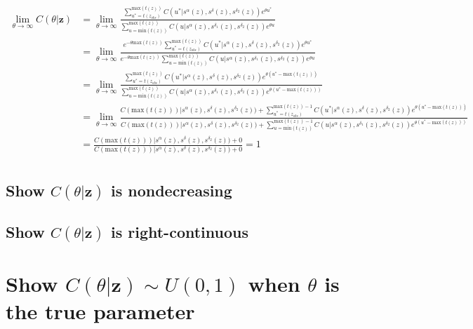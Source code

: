 \documentclass{article}
\begin{document}
\begin{align*}
  \lim_{\theta \to \infty} C(\theta|\textbf{z}) 
  &= \lim_{\theta \to \infty} \frac
  {\sum_{u^*=t(z_{obs})}^{\text{max}(t(z))} C(u^*|s^\alpha(z), s^\delta(z), s^{\delta_2}(z))e^{\theta u^*}}
  {\sum_{u=\text{min}(t(z))}^{\text{max}(t(z))} C(u|s^\alpha(z), s^{\delta_1}(z), s^{\delta_2}(z))e^{\theta u}} \\
  &= \lim_{\theta \to \infty} \frac
  {e^{-\theta \text{max}(t(z))} \sum_{u^*=t(z_{obs})}^{\text{max}(t(z))} 
  C(u^*|s^\alpha(z), s^\delta(z), s^{\delta_2}(z))e^{\theta u^*}}
  {e^{-\theta \text{max}(t(z))} \sum_{u=\text{min}(t(z))}^{\text{max}(t(z))} 
  C(u|s^\alpha(z), s^{\delta_1}(z), s^{\delta_2}(z))e^{\theta u}} \\
  &= \lim_{\theta \to \infty} \frac
  {\sum_{u^*=t(z_{obs})}^{\text{max}(t(z))} 
  C(u^*|s^\alpha(z), s^\delta(z), s^{\delta_2}(z))e^{\theta (u^*-\text{max}(t(z)))}}
  {\sum_{u=\text{min}(t(z))}^{\text{max}(t(z))} 
  C(u|s^\alpha(z), s^{\delta_1}(z), s^{\delta_2}(z))e^{\theta (u^*-\text{max}(t(z)))}} \\
  &= \lim_{\theta \to \infty} \frac
  {C(\text{max}(t(z)))|s^\alpha(z), s^\delta(z), s^{\delta_2}(z)) + \sum_{u^*=t(z_{obs})}^{\text{max}(t(z))-1} 
  C(u^*|s^\alpha(z), s^\delta(z), s^{\delta_2}(z))e^{\theta (u^*-\text{max}(t(z)))}}
  {C(\text{max}(t(z)))|s^\alpha(z), s^\delta(z), s^{\delta_2}(z)) + \sum_{u=\text{min}(t(z))}^{\text{max}(t(z))-1} 
  C(u|s^\alpha(z), s^{\delta_1}(z), s^{\delta_2}(z))e^{\theta (u^*-\text{max}(t(z)))}} \\
  &= \frac
  {C(\text{max}(t(z)))|s^\alpha(z), s^\delta(z), s^{\delta_2}(z)) + 0}
  {C(\text{max}(t(z)))|s^\alpha(z), s^\delta(z), s^{\delta_2}(z)) + 0} = 1 \\
\end{align*}

\subsection{Show $C(\theta|\textbf{z})$ is nondecreasing}
\subsection{Show $C(\theta|\textbf{z})$ is right-continuous}

\section{Show $C(\theta|\textbf{z}) \sim U(0, 1)$ when $\theta$ is the true parameter}
\end{document}
